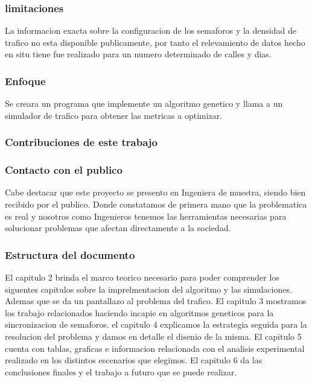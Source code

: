 \subsubsection{limitaciones}
La informacion exacta sobre la configuracion de los semaforos y la densidad de trafico no esta disponible publicamente, por tanto el relevamiento de datos hecho en situ tiene fue realizado para un numero determinado de calles y dias. 
\subsubsection{Enfoque}
Se creara un programa que implemente un algoritmo genetico  y llama a un simulador de trafico para obtener las metricas a optimizar.
\subsubsection{Contribuciones de este trabajo}
\subsubsection{Contacto con el publico}
Cabe destacar que este proyecto se presento en Ingeniera de muestra, siendo bien recibido por el publico. Donde constatamos de primera mano que la problematica es real y nosotros como Ingenieros tenemos las herramientas necesarias para solucionar problemas que afectan directamente a la sociedad.
\subsubsection{Estructura del documento}
El capitulo 2 brinda el marco teorico necesario para poder comprender los siguentes capitulos sobre la imprelmentacion del algoritmo y las simulaciones. Ademas que se da un pantallazo al problema del trafico.
El capitulo 3 mostramos los trabajo relacionados haciendo incapie en algoritmos geneticos para la sincronizacion de semaforos.
el capitulo 4 explicamos la estrategia seguida para la resolucion del problema y damos en detalle el disenio de la misma.
El capitulo 5 cuenta con tablas, graficas e informacion relacionada con el analisis experimental realizado en los distintos escenarios que elegimos.
El capitulo 6 da las conclusiones finales y el trabajo a futuro que se puede realizar.






